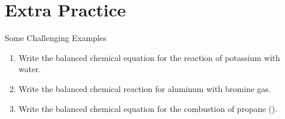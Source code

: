 \documentclass[notes=only]{beamer}
\begin{document}
\section{Extra Practice}

\begin{frame}[t]{Some Challenging Examples}
	\begin{enumerate}[<+->]
		\item Write the balanced chemical equation for the reaction of
			potassium with water.

			\vfill


		\item Write the balanced chemical reaction for aluminum with
			bromine gas.

			\vfill


		\item Write the balanced chemical equation for the combustion of
			propane ().

			\vfill

	\end{enumerate}
\end{frame}
\end{document}
